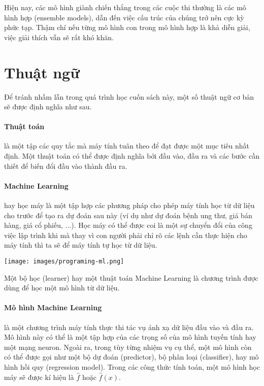 Hiện nay, các mô hình giành chiến thắng trong các cuộc thi thường là các mô hình hợp (ensemble models), dẫn đến việc cấu trúc của chúng trở nên cực kỳ phức tạp. Thậm chí nếu từng mô hình con trong mô hình hợp là khả diễn giải, việc giải thích vẫn sẽ rất khó khăn.

\section{Thuật ngữ}
Để tránh nhầm lẫn trong quá trình học cuốn sách này, một số thuật ngữ cơ bản sẽ được định nghĩa như sau.

\paragraph{Thuật toán} là một tập các quy tắc mà máy tính tuân theo để đạt được một mục tiêu nhất định. Một thuật toán có thể được định nghĩa bởi đầu vào, đầu ra và các bước cần thiết để biến đổi đầu vào thành đầu ra.

\paragraph{Machine Learning} hay học máy là một tập hợp các phương pháp cho phép máy tính học từ dữ liệu cho trước để tạo ra dự đoán sau này (ví dụ như dự đoán bệnh ung thư, giá bán hàng, giá cổ phiếu, ...). Học máy có thể được coi là một sự chuyển đổi của công việc lập trình khi mà thay vì con người phải chỉ rõ các lệnh cần thực hiện cho máy tính thì ta sẽ để máy tính tự học từ dữ liệu. 
\begin{figure*}[h!]
	\centering
	\texttt{[image: images/programing-ml.png]}
\end{figure*}

Một bộ học (learner) hay một thuật toán Machine Learning là chương trình được dùng để học một mô hình từ dữ liệu. 

\paragraph{Mô hình Machine Learning} là một chương trình máy tính thực thi tác vụ ánh xạ dữ liệu đầu vào và đầu ra. Mô hình này có thể là một tập hợp của các trọng số của mô hình tuyến tính hay một mạng neuron. Ngoài ra, trong tùy từng nhiệm vụ cụ thể, một mô hình còn có thể được gọi như một bộ dự đoán (predictor), bộ phân loại (classifier), hay mô hình hồi quy (regression model). Trong các công thức tính toán, một mô hình học máy sẽ được kí hiệu là $\hat{f}$ hoặc $\hat{f}(x)$. 

